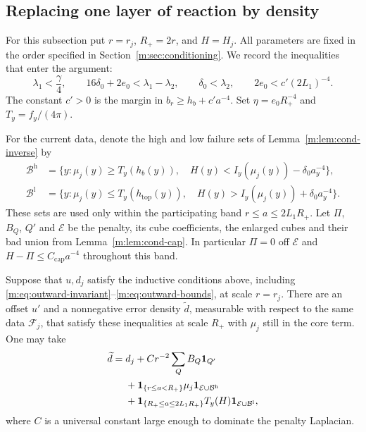 \subsection{Replacing one layer of reaction by density}

For this subsection put $r=r_j$, $R_+=2r$, and $H=H_j$.  All parameters are fixed in
the order specified in Section~\ref{m:sec:conditioning}.  We record the
inequalities that enter the argument:
\begin{equation}
\label{m:eq:outward-shifts}
 \lambda_1<\frac\gamma4,\qquad
 16\delta_0+2e_0<\lambda_1-\lambda_2,\qquad
 \delta_0<\lambda_2,\qquad
 2e_0<c'(2L_1)^{-4}.
\end{equation}
The constant $c'>0$ is the margin in $b_r\ge h_b+c'a^{-4}$.
Set $\eta=e_0R_+^{-4}$ and $T_y=f_y/(4\pi)$.

For the current data, denote the high and low failure sets of
Lemma~\ref{m:lem:cond-inverse} by
\begin{align*}
 \mathcal B^{\mathrm h}
  &=\{y:\mu_j(y)\ge T_y(h_b(y)),\quad
        H(y)<I_y(\mu_j(y))-\delta_0a_y^{-4}\},\\
 \mathcal B^{\mathrm l}
  &=\{y:\mu_j(y)\le T_y(h_{\mathrm{top}}(y)),\quad
        H(y)>I_y(\mu_j(y))+\delta_0a_y^{-4}\}.
\end{align*}
These sets are used only within the participating band
$r\le a\le2L_1R_+$.  Let $\Pi$, $B_Q$, $Q'$ and $\mathcal E$ be the penalty,
its cube coefficients, the enlarged cubes and their bad union from
Lemma~\ref{m:lem:cond-cap}.  In particular $\Pi=0$ off $\mathcal E$ and
$H-\Pi\le C_{\mathrm{cap}}a^{-4}$ throughout this band.

\begin{proposition}
\label{m:prop:outward-step}
Suppose that $u,d_j$ satisfy the inductive conditions above, including
\eqref{m:eq:outward-invariant}--\eqref{m:eq:outward-bounds}, at scale $r=r_j$.
There are an offset $u'$ and a nonnegative error density $\widetilde d$,
measurable with respect to the same data $\mathcal F_j$, that satisfy these
inequalities at scale $R_+$ with $\mu_j$ still in the core term.  One may take
\begin{align}
\label{m:eq:outward-error}
 \widetilde d={}&d_j+C r^{-2}\sum_Q B_Q\mathbf 1_{Q'}\notag\\
 &+\mathbf 1_{\{r\le a<R_+\}}\mu_j
                       \mathbf 1_{\mathcal E\cup\mathcal B^{\mathrm h}}\notag\\
 &+\mathbf 1_{\{R_+\le a\le2L_1R_+\}}T_y(H)
                       \mathbf 1_{\mathcal E\cup\mathcal B^{\mathrm l}},
\end{align}
where $C$ is a universal constant large enough to dominate the penalty
Laplacian.
\end{proposition}

